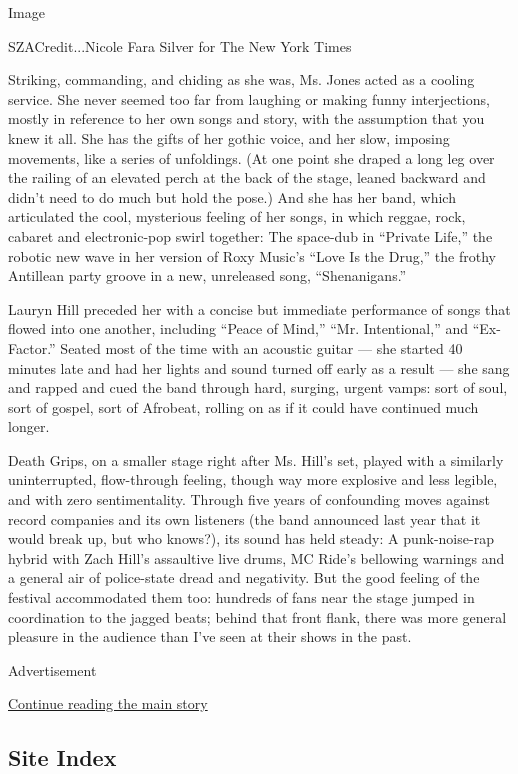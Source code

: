 Image

SZACredit...Nicole Fara Silver for The New York Times

Striking, commanding, and chiding as she was, Ms. Jones acted as a
cooling service. She never seemed too far from laughing or making funny
interjections, mostly in reference to her own songs and story, with the
assumption that you knew it all. She has the gifts of her gothic voice,
and her slow, imposing movements, like a series of unfoldings. (At one
point she draped a long leg over the railing of an elevated perch at the
back of the stage, leaned backward and didn't need to do much but hold
the pose.) And she has her band, which articulated the cool, mysterious
feeling of her songs, in which reggae, rock, cabaret and electronic-pop
swirl together: The space-dub in ``Private Life,'' the robotic new wave
in her version of Roxy Music's ``Love Is the Drug,'' the frothy
Antillean party groove in a new, unreleased song, ``Shenanigans.''

Lauryn Hill preceded her with a concise but immediate performance of
songs that flowed into one another, including ``Peace of Mind,'' ``Mr.
Intentional,'' and ``Ex-Factor.'' Seated most of the time with an
acoustic guitar --- she started 40 minutes late and had her lights and
sound turned off early as a result --- she sang and rapped and cued the
band through hard, surging, urgent vamps: sort of soul, sort of gospel,
sort of Afrobeat, rolling on as if it could have continued much longer.

Death Grips, on a smaller stage right after Ms. Hill's set, played with
a similarly uninterrupted, flow-through feeling, though way more
explosive and less legible, and with zero sentimentality. Through five
years of confounding moves against record companies and its own
listeners (the band announced last year that it would break up, but who
knows?), its sound has held steady: A punk-noise-rap hybrid with Zach
Hill's assaultive live drums, MC Ride's bellowing warnings and a general
air of police-state dread and negativity. But the good feeling of the
festival accommodated them too: hundreds of fans near the stage jumped
in coordination to the jagged beats; behind that front flank, there was
more general pleasure in the audience than I've seen at their shows in
the past.

Advertisement

\protect\hyperlink{after-bottom}{Continue reading the main story}

\hypertarget{site-index}{%
\subsection{Site Index}\label{site-index}}

